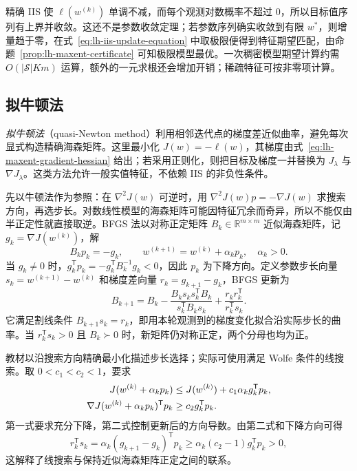 精确 IIS 使 $\ell(w^{(k)})$ 单调不减，而每个观测对数概率不超过 $0$，所以目标值序列有上界并收敛。这还不是参数收敛定理；若参数序列确实收敛到有限 $w^*$，则增量趋于零，在式~\eqref{eq:lh-iis-update-equation} 中取极限便得到特征期望匹配，由命题~\ref{prop:lh-maxent-certificate} 可知极限模型最优。一次稠密模型期望计算约需 $O(|\mathcal S|Km)$ 运算，额外的一元求根还会增加开销；稀疏特征可按非零项计算。

\subsection{拟牛顿法}
\label{subsec:lh-maxent-quasi-newton}

\emph{拟牛顿法}（quasi-Newton method）利用相邻迭代点的梯度差近似曲率，避免每次显式构造精确海森矩阵。这里最小化 $J(w)=-\ell(w)$，其梯度由式~\eqref{eq:lh-maxent-gradient-hessian} 给出；若采用正则化，则把目标及梯度一并替换为 $J_\lambda$ 与 $\nabla J_\lambda$。这类方法允许一般实值特征，不依赖 IIS 的非负性条件。

先以牛顿法作为参照：在 $\nabla^2J(w)$ 可逆时，用 $\nabla^2J(w)p=-\nabla J(w)$ 求搜索方向，再选步长。对数线性模型的海森矩阵可能因特征冗余而奇异，所以不能仅由半正定性就直接取逆。BFGS 法以对称正定矩阵 $B_k\in\mathbb R^{m\times m}$ 近似海森矩阵，记 $g_k=\nabla J(w^{(k)})$，解
\begin{equation}
B_kp_k=-g_k,\qquad
w^{(k+1)}=w^{(k)}+\alpha_kp_k,\quad\alpha_k>0.
\label{eq:lh-bfgs-direction}
\end{equation}
当 $g_k\ne0$ 时，$g_k^{\mathsf T}p_k=-g_k^{\mathsf T}B_k^{-1}g_k<0$，因此 $p_k$ 为下降方向。定义参数步长向量 $s_k=w^{(k+1)}-w^{(k)}$ 和梯度差向量 $r_k=g_{k+1}-g_k$，BFGS 更新为
\begin{equation}
B_{k+1}=B_k-\frac{B_ks_ks_k^{\mathsf T}B_k}{s_k^{\mathsf T}B_ks_k}
+\frac{r_kr_k^{\mathsf T}}{r_k^{\mathsf T}s_k}.
\label{eq:lh-bfgs-update}
\end{equation}
它满足割线条件 $B_{k+1}s_k=r_k$，即用本轮观测到的梯度变化拟合沿实际步长的曲率。当 $r_k^{\mathsf T}s_k>0$ 且 $B_k\succ0$ 时，新矩阵仍对称正定，两个分母也均为正。

教材以沿搜索方向精确最小化描述步长选择；实际可使用满足 Wolfe 条件的线搜索。取 $0<c_1<c_2<1$，要求
\begin{align}
J(w^{(k)}+\alpha_kp_k)&\leq J(w^{(k)})
+c_1\alpha_kg_k^{\mathsf T}p_k,\notag\\
\nabla J(w^{(k)}+\alpha_kp_k)^{\mathsf T}p_k
&\geq c_2g_k^{\mathsf T}p_k.
\label{eq:lh-wolfe-conditions}
\end{align}
第一式要求充分下降，第二式控制更新后的方向导数。由第二式和下降方向可得
\[
r_k^{\mathsf T}s_k
=\alpha_k(g_{k+1}-g_k)^{\mathsf T}p_k
\geq\alpha_k(c_2-1)g_k^{\mathsf T}p_k>0,
\]
这解释了线搜索与保持近似海森矩阵正定之间的联系。

